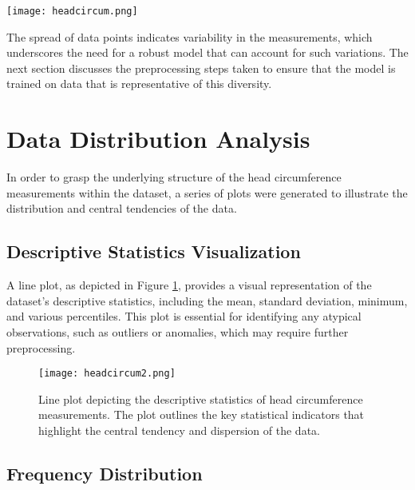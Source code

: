 \documentclass{report}
\begin{document}
\begin{figure*}[htbp]
  \centering
  \texttt{[image: headcircum.png]}
  \caption{Scatter plot illustrating the relationship between pixel size (mm) and head circumference (mm). Each point represents an individual image in the dataset. A discernible trend suggests a correlation that may be pivotal for the predictive modeling process.}
  \label{fig:scatterplot}
\end{figure*}


The spread of data points indicates variability in the measurements, which underscores the need for a robust model that can account for such variations. The next section discusses the preprocessing steps taken to ensure that the model is trained on data that is representative of this diversity.

\section{Data Distribution Analysis}

In order to grasp the underlying structure of the head circumference measurements within the dataset, a series of plots were generated to illustrate the distribution and central tendencies of the data.

\subsection{Descriptive Statistics Visualization}

A line plot, as depicted in Figure \ref{fig:lineplot}, provides a visual representation of the dataset's descriptive statistics, including the mean, standard deviation, minimum, and various percentiles. This plot is essential for identifying any atypical observations, such as outliers or anomalies, which may require further preprocessing.

\begin{figure}[htbp]
  \centering
  \texttt{[image: headcircum2.png]}
  \caption{Line plot depicting the descriptive statistics of head circumference measurements. The plot outlines the key statistical indicators that highlight the central tendency and dispersion of the data.}
  \label{fig:lineplot}
\end{figure}

\subsection{Frequency Distribution}
\end{document}
